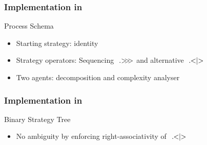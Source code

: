 \documentclass[xcolor=table%
,t]{beamer}
\begin{document}


\begin{frame}
  \frametitle{Implementation in \tct{}}

  \begin{block}{Process Schema~\footnotemark}
    \centering
    \resizebox{0.9\linewidth}{!}{}
    \begin{itemize}
    \item Starting strategy: identity
    \item Strategy operators: Sequencing \(\ .\hspace{-2.5pt}>\hspace{-3.0pt}>\hspace{-3.0pt}>\) and alternative \(\ .\hspace{-3.0pt}<\hspace{-3.0pt}|\hspace{-3.0pt}>\)
    \item Two agents: decomposition and complexity analyser
    \end{itemize}
  \end{block}
\end{frame}

\begin{frame}
  \frametitle{Implementation in \tct{}}

  \begin{block}{Binary Strategy Tree~\footnotemark}
    \centering
    \resizebox{0.8\linewidth}{!}{}
    \begin{itemize}
    \item No ambiguity by enforcing right-associativity of \(\ .\hspace{-3.0pt}<\hspace{-3.0pt}|\hspace{-3.0pt}>\)
    \end{itemize}
  \end{block}
\end{frame}
\end{document}
